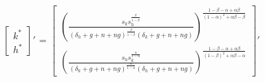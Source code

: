 \documentclass{article}
\begin{document}
\begin{center}
 $ \begin{bmatrix}
  k^* \\ h^*
 \end{bmatrix}'$ 
 =
  $ \begin{bmatrix}
  \left(\frac{s_k s_h^{\frac{ \beta}{1-\beta}}}{\left(\delta_h +g+n+ng\right)^{\frac{\beta}{1-\beta}}\left(\delta_k +g+n+ng\right)}\right)^{\frac{1-\beta- \alpha + \alpha \beta}{\left(1-\alpha\right)^2 +\alpha \beta -\beta}}  \\ \left(\frac{s_h s_k^{\frac{\alpha}{1-\alpha}}}{\left(\delta_k +g+n+ng\right)^{\frac{\alpha}{1-\alpha}}\left(\delta_h +g+n+ng\right)}\right)^{\frac{1-\beta- \alpha + \alpha \beta}{\left(1-\beta \right)^2 +\alpha \beta -\alpha}}
 \end{bmatrix}'$ 
 \end{center}
 \setcounter{subsection}{5}
\end{document}
